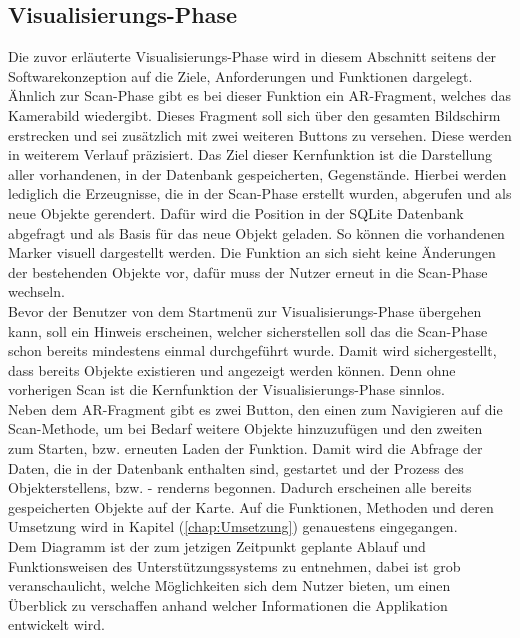 \subsection*{Visualisierungs-Phase}
Die zuvor erläuterte Visualisierungs-Phase wird in diesem Abschnitt seitens der Softwarekonzeption auf die Ziele, Anforderungen und 
Funktionen dargelegt.
\\ 
Ähnlich zur Scan-Phase gibt es bei dieser Funktion ein \acs{AR}-Fragment, welches das Kamerabild wiedergibt. Dieses Fragment soll sich 
über den gesamten Bildschirm erstrecken und sei zusätzlich mit zwei weiteren Buttons zu versehen. Diese werden in weiterem Verlauf 
präzisiert. Das Ziel dieser Kernfunktion ist die Darstellung aller vorhandenen, in der Datenbank gespeicherten, Gegenstände. Hierbei werden 
lediglich die Erzeugnisse, die in der Scan-Phase erstellt wurden, abgerufen und als neue Objekte gerendert. Dafür wird die Position in der 
SQLite Datenbank abgefragt und als Basis für das neue Objekt geladen. So können die vorhandenen Marker visuell dargestellt werden. Die 
Funktion an sich sieht keine Änderungen der bestehenden Objekte vor, dafür muss der Nutzer erneut in die Scan-Phase wechseln.
\\ 
Bevor der Benutzer von dem Startmenü zur Visualisierungs-Phase übergehen kann, soll ein Hinweis erscheinen, welcher sicherstellen soll das 
die Scan-Phase schon bereits mindestens einmal durchgeführt wurde. Damit wird sichergestellt, dass bereits Objekte existieren und angezeigt 
werden können. Denn ohne vorherigen Scan ist die Kernfunktion der Visualisierungs-Phase sinnlos.
\\
Neben dem \acs{AR}-Fragment gibt es zwei Button, den einen zum Navigieren auf die Scan-Methode, um bei Bedarf weitere Objekte 
hinzuzufügen und den zweiten zum Starten, bzw. erneuten Laden der Funktion. Damit wird die Abfrage der Daten, die in der Datenbank 
enthalten sind, gestartet und der Prozess des Objekterstellens, bzw. - renderns begonnen. Dadurch erscheinen alle bereits gespeicherten 
Objekte auf der Karte. Auf die Funktionen, Methoden und deren Umsetzung wird in Kapitel (\ref{chap:Umsetzung}) genauestens eingegangen.
\\ 
\linebreak
Dem Diagramm ist der zum jetzigen Zeitpunkt geplante Ablauf und Funktionsweisen des Unterstützungssystems zu entnehmen, dabei ist grob 
veranschaulicht, welche Möglichkeiten sich dem Nutzer bieten, um einen Überblick zu verschaffen anhand welcher Informationen die 
Applikation entwickelt wird. 
